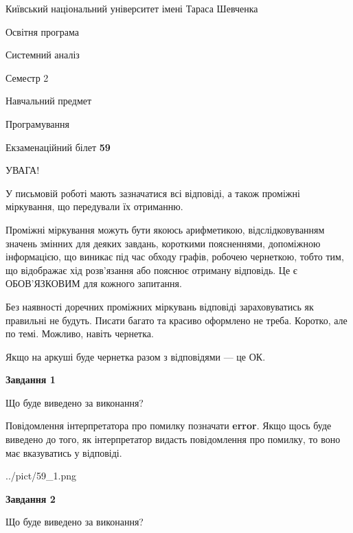 \documentclass[12pt, ukrainian]{article}
\begin{document}
{{\begin {small}\par
{ \center  Київський національний університет імені Тараса Шевченка \par}
{\parbox {5 cm}{Освітня програма \hfill}{\parbox {7 cm}{Системний аналіз \hfill}}\parbox {6 cm}{\hfill Семестр 2}}\par
{\parbox {5 cm} {Навчальний предмет \hfill}\parbox {7 cm}{Програмування \hfill}\parbox {6cm}{\hfill}\par}\vspace{-7pt} \end{small}}{\center Екзаменаційний білет \No \textbf
{ 59 }\par}}
{
\begin {large}
УВАГА!

У письмовій роботі мають зазначатися всі відповіді, а також проміжні міркування, що передували їх отриманню.

Проміжні міркування можуть бути якоюсь арифметикою, відслідковуванням зна\-чень змінних для деяких завдань,
короткими поясненнями, допоміжною інформацією, що виникає під час обходу графів, робочею чернеткою,
тобто тим, що відображає хід розв’язання або пояснює отриману відповідь.
Це є ОБОВ’ЯЗКОВИМ для кожного запитання.

Без наявності доречних проміжних міркувань відповіді зараховуватись як правиль\-ні не будуть.
Писати багато та красиво оформлено не треба. Коротко, але по темі. Можли\-во, навіть чернетка.

Якщо на аркуші буде чернетка разом з відповідями --- це ОК.

\newpage

{\begin {center}\textbf{Завдання 1}\end {center}}\par
Що буде виведено за виконання?

Повідомлення інтерпретатора про помилку позначати \textbf{error}.
Якщо щось буде виведено до того, як інтерпретатор видасть повідомлення про помилку, 
то воно має вказуватись у відповіді. \par


\begin{center}
	{../pict/59_1.png}
\end{center}
\newpage

{\begin {center}\textbf{Завдання 2}\end {center}}\par
Що буде виведено за виконання?


\end{large}}
\end{document}
